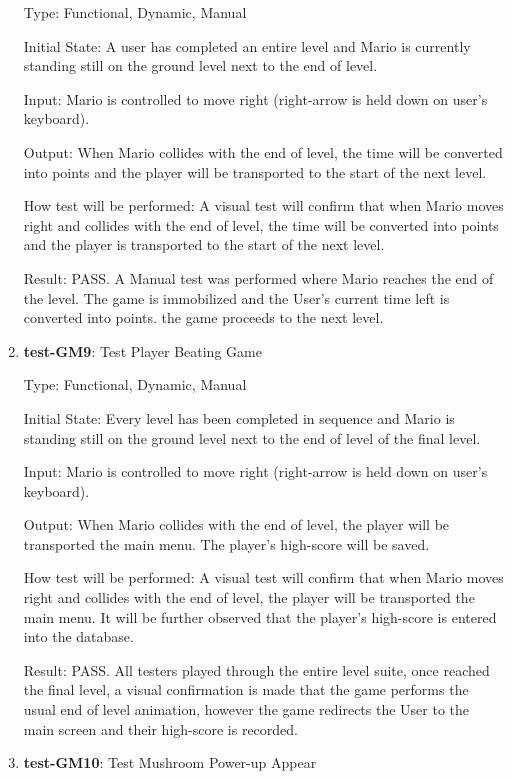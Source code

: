 \documentclass[12pt, titlepage]{article}
\begin{document}
\begin{enumerate}
Type: Functional, Dynamic, Manual

Initial State: A user has completed an entire level and Mario is currently standing still on the ground level next to the end of level.
					
Input: Mario is controlled to move right (right-arrow is held down on user's keyboard).
					
Output: When Mario collides with the end of level, the time will be converted into points and the player will be transported to the start of the next level.
					
How test will be performed: A visual test will confirm that when Mario moves right and collides with the end of level, the time will be converted into points and the player is transported to the start of the next level.

Result: PASS. A Manual test was performed where Mario reaches the end of the level. The game is immobilized and the User's current time left is converted into points. the game proceeds to the next level.

\item{\textbf{test-GM9}: Test Player Beating Game\\}

Type: Functional, Dynamic, Manual

Initial State: Every level has been completed in sequence and Mario is standing still on the ground level next to the end of level of the final level.
					
Input: Mario is controlled to move right (right-arrow is held down on user's keyboard).
					
Output: When Mario collides with the end of level, the player will be transported the main menu. The player's high-score will be saved.
					
How test will be performed: A visual test will confirm that when Mario moves right and collides with the end of level, the player will be transported the main menu. It will be further observed that the player's high-score is entered into the database.

Result: PASS. All testers played through the entire level suite, once reached the final level, a visual confirmation is made that the game performs the usual end of level animation, however the game redirects the User to the main screen and their high-score is recorded.

\item{\textbf{test-GM10}: Test Mushroom Power-up Appear\\}


\end{enumerate}
\end{document}
